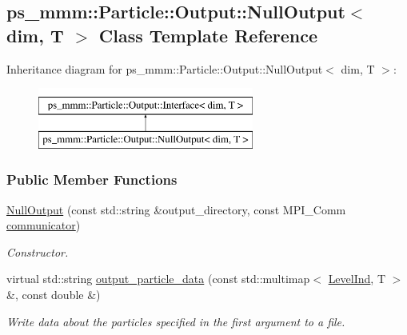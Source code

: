 \hypertarget{classps__mmm_1_1_particle_1_1_output_1_1_null_output}{}\subsection{ps\+\_\+mmm\+:\+:Particle\+:\+:Output\+:\+:Null\+Output$<$ dim, T $>$ Class Template Reference}
\label{classps__mmm_1_1_particle_1_1_output_1_1_null_output}
Inheritance diagram for ps\+\_\+mmm\+:\+:Particle\+:\+:Output\+:\+:Null\+Output$<$ dim, T $>$\+:\begin{figure}[H]
\begin{center}
\leavevmode
\includegraphics[height=2.000000cm]{classps__mmm_1_1_particle_1_1_output_1_1_null_output}
\end{center}
\end{figure}
\subsubsection*{Public Member Functions}
\begin{DoxyCompactItemize}
\item 
\hyperlink{classps__mmm_1_1_particle_1_1_output_1_1_null_output_af045630fde3a698ea995f4baeddad37a}{Null\+Output} (const std\+::string \&output\+\_\+directory, const M\+P\+I\+\_\+\+Comm \hyperlink{classps__mmm_1_1_particle_1_1_output_1_1_interface_ae3fcfd82092c40864ec09918f03b91d0}{communicator})
\begin{DoxyCompactList}\small\item\em Constructor. \end{DoxyCompactList}\item 
virtual std\+::string \hyperlink{classps__mmm_1_1_particle_1_1_output_1_1_null_output_a739195c26a53a287fc802dc718b382d4}{output\+\_\+particle\+\_\+data} (const std\+::multimap$<$ \hyperlink{namespaceps__mmm_1_1_particle_a475174140997ceb63cc9e801b6c0c4b8}{Level\+Ind}, T $>$ \&, const double \&)
\begin{DoxyCompactList}\small\item\em Write data about the particles specified in the first argument to a file. \end{DoxyCompactList}\end{DoxyCompactItemize}
